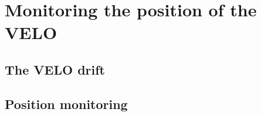 
\chapter{Monitoring the position of the VELO}
\label{chp:pos_VELO}

\section{The VELO drift}

\section{Position monitoring}
